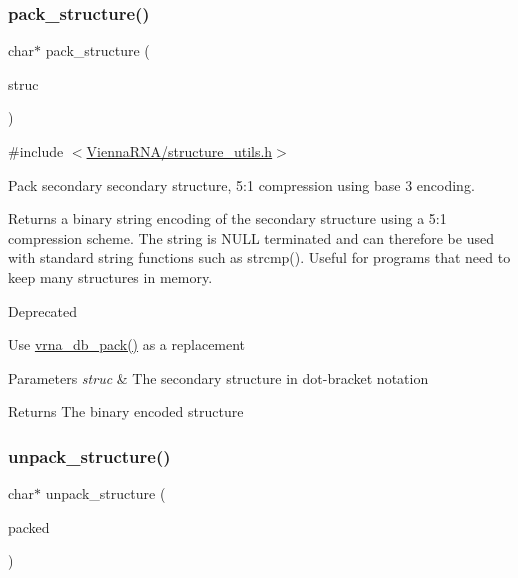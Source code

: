 \subsubsection{\texorpdfstring{pack\+\_\+structure()}{pack\_structure()}}
{\footnotesize\ttfamily char$\ast$ pack\+\_\+structure (\begin{DoxyParamCaption}\item[{const char $\ast$}]{struc }\end{DoxyParamCaption})}



{\ttfamily \#include $<$\mbox{\hyperlink{structure__utils_8h}{Vienna\+R\+N\+A/structure\+\_\+utils.\+h}}$>$}



Pack secondary secondary structure, 5\+:1 compression using base 3 encoding. 

Returns a binary string encoding of the secondary structure using a 5\+:1 compression scheme. The string is N\+U\+LL terminated and can therefore be used with standard string functions such as strcmp(). Useful for programs that need to keep many structures in memory.

\begin{DoxyRefDesc}{Deprecated}
\item[\mbox{\hyperlink{deprecated__deprecated000138}{Deprecated}}]Use \mbox{\hyperlink{group__struct__utils_ga55c4783060a1464f862f858d5599c9e1}{vrna\+\_\+db\+\_\+pack()}} as a replacement \end{DoxyRefDesc}

\begin{DoxyParams}{Parameters}
{\em struc} & The secondary structure in dot-\/bracket notation \\
\hline
\end{DoxyParams}
\begin{DoxyReturn}{Returns}
The binary encoded structure 
\end{DoxyReturn}
\mbox{\label{group__struct__utils_ga071c6921efe1eb974f115ee6fefa3c39}} 
\subsubsection{\texorpdfstring{unpack\+\_\+structure()}{unpack\_structure()}}
{\footnotesize\ttfamily char$\ast$ unpack\+\_\+structure (\begin{DoxyParamCaption}\item[{const char $\ast$}]{packed }\end{DoxyParamCaption})}



